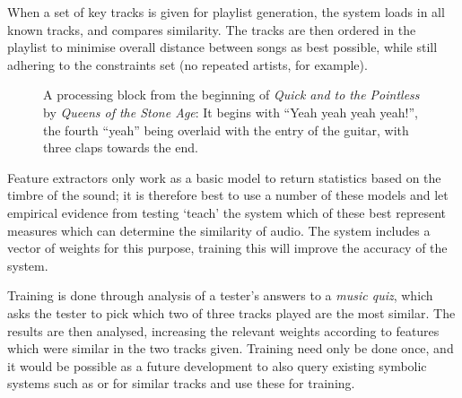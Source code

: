 When a set of key tracks is given for playlist generation, the system loads in all known tracks, and compares similarity. The tracks are then ordered in the playlist to minimise overall distance between songs as best possible, while still adhering to the constraints set (no repeated artists, for example).
\begin{figure}[h]
	\centering
	\caption{A processing block from the beginning of \emph{Quick and to the Pointless} by \emph{Queens of the Stone Age}: It begins with ``Yeah yeah yeah yeah!'', the fourth ``yeah'' being overlaid with the entry of the guitar, with three claps towards the end.}
	\label{fig:method:block}
\end{figure}

Feature extractors only work as a basic model to return statistics based on the timbre of the sound; it is therefore best to use a number of these models and let empirical evidence from testing `teach' the system which of these best represent measures which can determine the similarity of audio. The system includes a vector of weights for this purpose, training this will improve the accuracy of the system.

Training is done through analysis of a tester's answers to a \emph{music quiz}, which asks the tester to pick which two of three tracks played are the most similar. The results are then analysed, increasing the relevant weights according to features which were similar in the two tracks given. Training need only be done once, and it would be possible as a future development to also query existing symbolic systems such as  or  for similar tracks and use these for training.

